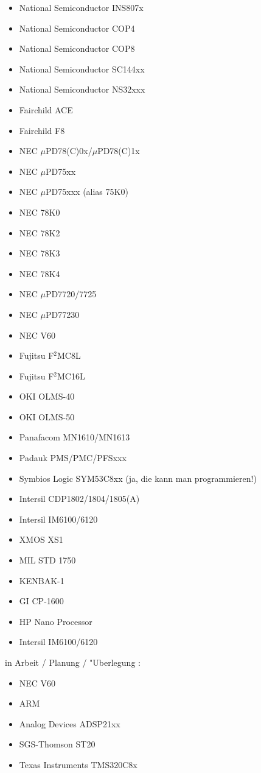 \documentclass[12pt,a4paper,twoside]{report}
\begin{document}
\begin{itemize}
\item{National Semiconductor INS807x}
\item{National Semiconductor COP4}
\item{National Semiconductor COP8}
\item{National Semiconductor SC144xx}
\item{National Semiconductor NS32xxx}
\item{Fairchild ACE}
\item{Fairchild F8}
\item{NEC $\mu$PD78(C)0x/$\mu$PD78(C)1x}
\item{NEC $\mu$PD75xx}
\item{NEC $\mu$PD75xxx (alias 75K0)}
\item{NEC 78K0}
\item{NEC 78K2}
\item{NEC 78K3}
\item{NEC 78K4}
\item{NEC $\mu$PD7720/7725}
\item{NEC $\mu$PD77230}
\item{NEC V60}
\item{Fujitsu F$^2$MC8L}
\item{Fujitsu F$^2$MC16L}
\item{OKI OLMS-40}
\item{OKI OLMS-50}
\item{Panafacom MN1610/MN1613}
\item{Padauk PMS/PMC/PFSxxx}
\item{Symbios Logic SYM53C8xx (ja, die kann man programmieren!)}
\item{Intersil CDP1802/1804/1805(A)}
\item{Intersil IM6100/6120}
\item{XMOS XS1}
\item{MIL STD 1750}
\item{KENBAK-1}
\item{GI CP-1600}
\item{HP Nano Processor}
\item{Intersil IM6100/6120}
\end{itemize}
in Arbeit / Planung / "Uberlegung :
\begin{itemize}
\item{NEC V60}
\item{ARM}
\item{Analog Devices ADSP21xx}
\item{SGS-Thomson ST20}
\item{Texas Instruments TMS320C8x}
\end{itemize}
\end{document}
